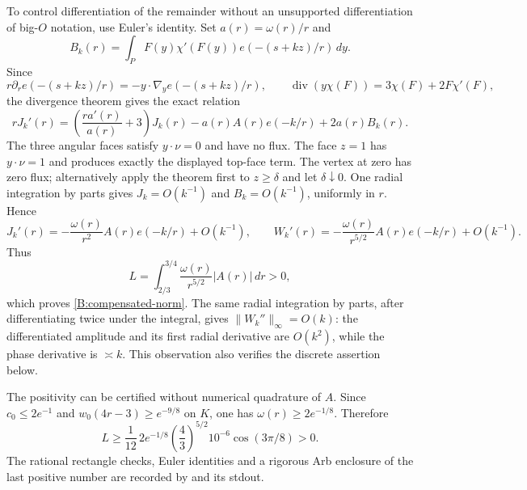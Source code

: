 To control differentiation of the remainder without an unsupported
differentiation of big-$O$ notation, use Euler's identity.  Set
$a(r)=\omega(r)/r$ and
\[
 B_k(r)=\int_P F(y)\chi'(F(y))e(-(s+kz)/r)\,dy.
\]
Since
\[
 r\partial_r e(-(s+kz)/r)=-y\cdot\nabla_y e(-(s+kz)/r),\qquad
 \operatorname{div}(y\chi(F))=3\chi(F)+2F\chi'(F),
\]
the divergence theorem gives the exact relation
\begin{equation}\label{B:compensated-Euler}
 rJ_k'(r)=\left(\frac{ra'(r)}{a(r)}+3\right)J_k(r)
       -a(r)A(r)e(-k/r)+2a(r)B_k(r).
\end{equation}
The three angular faces satisfy $y\cdot\nu=0$ and have no flux.
The face $z=1$ has $y\cdot\nu=1$ and produces exactly the displayed
top-face term.  The vertex at zero has zero flux; alternatively apply
the theorem first to $z\geq\delta$ and let $\delta\downarrow0$.
One radial integration by parts gives $J_k=O(k^{-1})$ and
$B_k=O(k^{-1})$, uniformly in $r$.  Hence
\[
 J_k'(r)=-\frac{\omega(r)}{r^2}A(r)e(-k/r)+O(k^{-1}),\qquad
 W_k'(r)=-\frac{\omega(r)}{r^{5/2}}A(r)e(-k/r)+O(k^{-1}).
\]
Thus
\begin{equation}\label{B:compensated-L}
 L=\int_{2/3}^{3/4}\frac{\omega(r)}{r^{5/2}}|A(r)|\,dr>0,
\end{equation}
which proves \eqref{B:compensated-norm}.  The same radial integration
by parts, after differentiating twice under the integral, gives
$\|W_k''\|_\infty=O(k)$: the differentiated amplitude and its first
radial derivative are $O(k^2)$, while the phase derivative is
$\asymp k$.  This observation also verifies the discrete assertion
below.

The positivity can be certified without numerical quadrature of
$A$.  Since $c_0\leq2e^{-1}$ and
$w_0(4r-3)\geq e^{-9/8}$ on $K$, one has
$\omega(r)\geq2e^{-1/8}$.  Therefore
\begin{equation}\label{B:compensated-explicit-lower}
 L\geq\frac1{12}\,2e^{-1/8}\left(\frac43\right)^{5/2}
           10^{-6}\cos(3\pi/8)>0.
\end{equation}
The rational rectangle checks, Euler identities and a rigorous Arb
enclosure of the last positive number are recorded by
 and its stdout.

